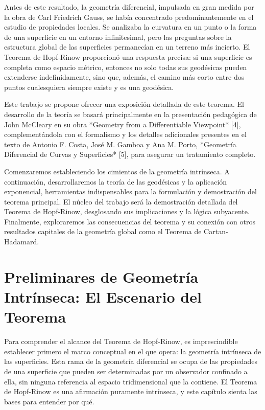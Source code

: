 \documentclass[12pt, a4paper]{report}
\theoremstyle{miestilo}
\theoremstyle{midefinicion}
\begin{document}
Antes de este resultado, la geometría diferencial, impulsada en gran medida por la obra de Carl Friedrich Gauss, se había concentrado predominantemente en el estudio de propiedades locales. Se analizaba la curvatura en un punto o la forma de una superficie en un entorno infinitesimal, pero las preguntas sobre la estructura global de las superficies permanecían en un terreno más incierto. El Teorema de Hopf-Rinow proporcionó una respuesta precisa: si una superficie es completa como espacio métrico, entonces no solo todas sus geodésicas pueden extenderse indefinidamente, sino que, además, el camino más corto entre dos puntos cualesquiera siempre existe y es una geodésica.

Este trabajo se propone ofrecer una exposición detallada de este teorema. El desarrollo de la teoría se basará principalmente en la presentación pedagógica de John McCleary en su obra *Geometry from a Differentiable Viewpoint* [4], complementándola con el formalismo y los detalles adicionales presentes en el texto de Antonio F. Costa, José M. Gamboa y Ana M. Porto, *Geometría Diferencial de Curvas y Superficies* [5], para asegurar un tratamiento completo.

Comenzaremos estableciendo los cimientos de la geometría intrínseca. A continuación, desarrollaremos la teoría de las geodésicas y la aplicación exponencial, herramientas indispensables para la formulación y demostración del teorema principal. El núcleo del trabajo será la demostración detallada del Teorema de Hopf-Rinow, desglosando sus implicaciones y la lógica subyacente. Finalmente, exploraremos las consecuencias del teorema y su conexión con otros resultados capitales de la geometría global como el Teorema de Cartan-Hadamard.

\chapter{Preliminares de Geometría Intrínseca: El Escenario del Teorema}

Para comprender el alcance del Teorema de Hopf-Rinow, es imprescindible establecer primero el marco conceptual en el que opera: la geometría intrínseca de las superficies. Esta rama de la geometría diferencial se ocupa de las propiedades de una superficie que pueden ser determinadas por un observador confinado a ella, sin ninguna referencia al espacio tridimensional que la contiene. El Teorema de Hopf-Rinow es una afirmación puramente intrínseca, y este capítulo sienta las bases para entender por qué.
\end{document}
